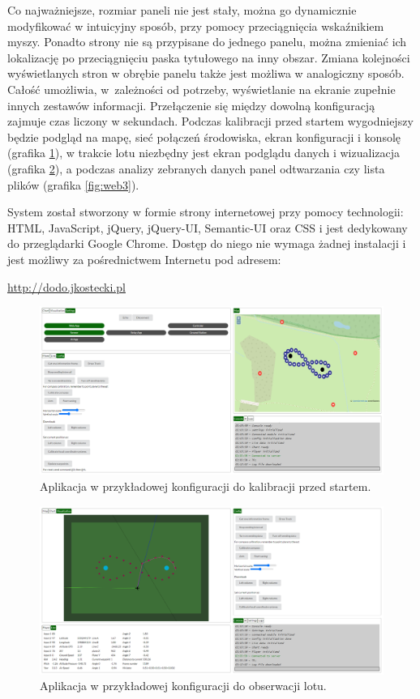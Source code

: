 \documentclass[12pt, a4paper]{article}
\begin{document}
Co najważniejsze, rozmiar paneli nie jest stały, można go dynamicznie modyfikować w intuicyjny sposób, przy pomocy przeciągnięcia wskaźnikiem myszy. Ponadto strony nie są przypisane do jednego panelu, można zmieniać ich lokalizację po przeciągnięciu paska tytułowego na inny obszar. Zmiana kolejności wyświetlanych stron w obrębie panelu także jest możliwa w analogiczny sposób. Całość umożliwia, w~zależności od potrzeby, wyświetlanie na ekranie zupełnie innych zestawów informacji. Przełączenie się między dowolną konfiguracją zajmuje czas liczony w sekundach. Podczas kalibracji przed startem wygodniejszy będzie podgląd na mapę, sieć połączeń środowiska, ekran konfiguracji i konsolę (grafika \ref{fig:web1}), w trakcie lotu niezbędny jest ekran podglądu danych i wizualizacja (grafika \ref{fig:web2}), a podczas analizy zebranych danych panel odtwarzania czy lista plików (grafika \ref{fig:web3}).

System został stworzony w formie strony internetowej przy pomocy technologii: HTML, JavaScript, jQuery, jQuery-UI, Semantic-UI oraz CSS i jest dedykowany do przeglądarki Google Chrome. Dostęp do niego nie wymaga żadnej instalacji i jest możliwy za pośrednictwem Internetu pod adresem:

\begin{center}
\url{http://dodo.jkostecki.pl}
\end{center}

 \begin{figure}[ht]
    \centering
    \includegraphics[width=1\textwidth]{przedlotem}
    \caption{Aplikacja w przykładowej konfiguracji do kalibracji przed startem.}
    \label{fig:web1}
\end{figure}

 \begin{figure}[ht]
    \centering
    \includegraphics[width=1\textwidth]{podczaslotu}
    \caption{Aplikacja w przykładowej konfiguracji do obserwacji lotu.}
    \label{fig:web2}
\end{figure}
\end{document}
